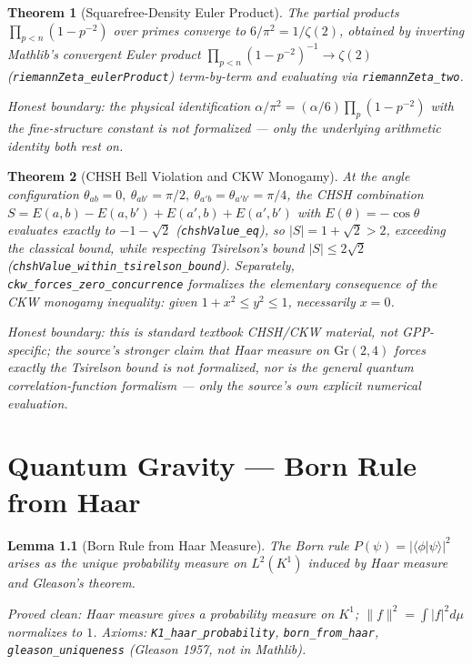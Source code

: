 \documentclass{report}
\newtheorem{theorem}{Theorem}[chapter]
\newtheorem{lemma}[theorem]{Lemma}
\theoremstyle{definition}
\begin{document}
\begin{theorem}[Squarefree-Density Euler Product]
  \label{thm:squarefree-density}
  \leanok
  The partial products $\prod_{p < n}(1-p^{-2})$ over primes converge to
  $6/\pi^2 = 1/\zeta(2)$, obtained by inverting Mathlib's convergent
  Euler product $\prod_{p<n}(1-p^{-2})^{-1} \to \zeta(2)$
  (\texttt{riemannZeta\_eulerProduct}) term-by-term and evaluating via
  \texttt{riemannZeta\_two}.

  \emph{Honest boundary:} the physical identification
  $\alpha/\pi^2 = (\alpha/6)\prod_p(1-p^{-2})$ with the fine-structure
  constant is not formalized — only the underlying arithmetic identity
  both rest on.
\end{theorem}

\begin{theorem}[CHSH Bell Violation and CKW Monogamy]
  \label{thm:chsh-violation}
  \leanok
  At the angle configuration $\theta_{ab}=0,\ \theta_{ab'}=\pi/2,\
  \theta_{a'b}=\theta_{a'b'}=\pi/4$, the CHSH combination
  $S = E(a,b)-E(a,b')+E(a',b)+E(a',b')$ with $E(\theta)=-\cos\theta$
  evaluates exactly to $-1-\sqrt2$
  (\texttt{chshValue\_eq}), so $|S| = 1+\sqrt2 > 2$, exceeding the
  classical bound, while respecting Tsirelson's bound $|S|\le 2\sqrt2$
  (\texttt{chshValue\_within\_tsirelson\_bound}). Separately,
  \texttt{ckw\_forces\_zero\_concurrence} formalizes the elementary
  consequence of the CKW monogamy inequality: given
  $1+x^2 \le y^2 \le 1$, necessarily $x=0$.

  \emph{Honest boundary:} this is standard textbook CHSH/CKW material,
  not GPP-specific; the source's stronger claim that Haar measure on
  $\mathrm{Gr}(2,4)$ \emph{forces} exactly the Tsirelson bound is not
  formalized, nor is the general quantum correlation-function formalism
  — only the source's own explicit numerical evaluation.
\end{theorem}

\chapter{Quantum Gravity --- Born Rule from Haar}

\begin{lemma}[Born Rule from Haar Measure]
  \label{lem:born-rule-haar}
  The Born rule $P(\psi) = |\langle\phi|\psi\rangle|^2$ arises as the unique
  probability measure on $L^2(K^1)$ induced by Haar measure and
  Gleason's theorem.

  \emph{Proved clean:} Haar measure gives a probability measure on $K^1$;
  $\|f\|^2 = \int|f|^2 d\mu$ normalizes to $1$.
  \emph{Axioms:} \texttt{K1\_haar\_probability}, \texttt{born\_from\_haar},
  \texttt{gleason\_uniqueness} (Gleason 1957, not in Mathlib).
\end{lemma}
\end{document}
